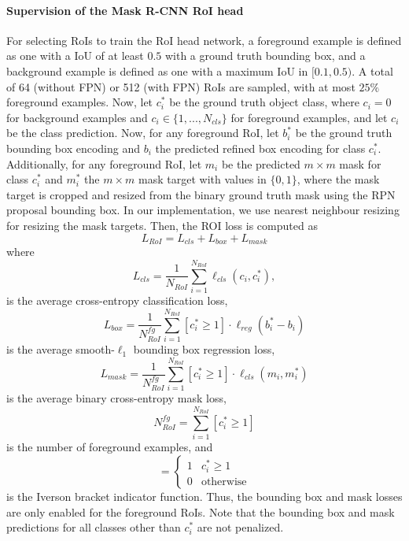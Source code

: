 \paragraph{Supervision of the Mask R-CNN RoI head}
For selecting RoIs to train the RoI head network, a foreground example
is defined as one with a IoU of at least $0.5$ with
a ground truth bounding box, and a background example is defined as
one with a maximum IoU in $[0.1, 0.5)$.
A total of 64 (without FPN) or 512 (with FPN) RoIs are sampled, with
at most $25\%$ foreground examples.
Now, let $c_i^*$ be the ground truth object class, where $c_i = 0$
for background examples and $c_i \in \{1, ..., N_{cls}\}$ for foreground examples,
and let $c_i$ be the class prediction.
Now, for any foreground RoI, let $b_i^*$ be the ground truth bounding box encoding and $b_i$
the predicted refined box encoding for class $c_i^*$.
Additionally, for any foreground RoI, let $m_i$ be the predicted $m \times m$ mask for class $c_i^*$
and $m_i^*$ the $m \times m$ mask target with values in $\{0,1\}$, where the mask target is cropped and resized from
the binary ground truth mask using the RPN proposal bounding box.
In our implementation, we use nearest neighbour resizing for resizing the mask
targets.
Then, the ROI loss is computed as
\begin{equation}
L_{RoI} = L_{cls} + L_{box} + L_{mask}
\end{equation}
where
\begin{equation}
L_{cls} = \frac{1}{N_{RoI}} \sum_{i=1}^{N_{RoI}} \ell_{cls}(c_i, c_i^*),
\end{equation}
is the average cross-entropy classification loss,
\begin{equation}
L_{box} = \frac{1}{N_{RoI}^{fg}} \sum_{i=1}^{N_{RoI}} [c_i^* \geq 1] \cdot \ell_{reg}(b_i^* - b_i)
\end{equation}
is the average smooth-$\ell_1$ bounding box regression loss,
\begin{equation}
L_{mask} = \frac{1}{N_{RoI}^{fg}} \sum_{i=1}^{N_{RoI}} [c_i^* \geq 1] \cdot \ell_{cls}(m_i,m_i^*)
\end{equation}
is the average binary cross-entropy mask loss,
\begin{equation}
N_{RoI}^{fg} = \sum_{i=1}^{N_{RoI}} [c_i^* \geq 1]
\end{equation}
is the number of foreground examples, and
\begin{equation}
[c_i^* \geq 1] =
\begin{cases}
1 &\text{$c_i^* \geq 1$} \\
0 &\text{otherwise}
\end{cases}
\end{equation}
is the Iverson bracket indicator function. Thus, the bounding box and mask
losses are only enabled for the foreground RoIs. Note that the bounding box and mask predictions
for all classes other than $c_i^*$ are not penalized.

